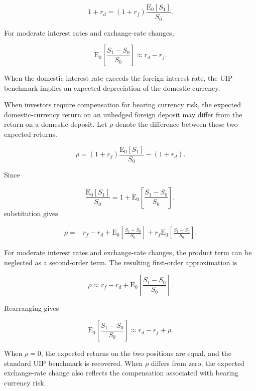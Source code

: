\begin{equation}
1+r_d
=
(1+r_f)\frac{\mathrm{E}_0[S_1]}{S_0}.
\label{eq:ch10-uip-exact}
\end{equation}

For moderate interest rates and exchange-rate changes,

\begin{equation}
\mathrm{E}_0\left[\frac{S_1-S_0}{S_0}\right]
\approx
r_d-r_f.
\label{eq:ch10-uip-approx}
\end{equation}

When the domestic interest rate exceeds the foreign
interest rate, the UIP benchmark implies an expected
depreciation of the domestic currency. 

When investors require compensation for bearing
currency risk, the expected domestic-currency return
on an unhedged foreign deposit may differ from the
return on a domestic deposit. Let $\rho$ denote the
difference between these two expected returns.

\begin{equation}
\rho
=
(1+r_f)\frac{\mathrm{E}_0[S_1]}{S_0}
-
(1+r_d).
\label{eq:ch10-currency-risk-premium}
\end{equation}

Since

\[
\frac{\mathrm{E}_0[S_1]}{S_0}
=
1+
\mathrm{E}_0\left[\frac{S_1-S_0}{S_0}\right],
\]
substitution gives

\begin{align}
\rho
={}&r_f-r_d
+\mathrm{E}_0\left[\frac{S_1-S_0}{S_0}\right]
+r_f\mathrm{E}_0\left[\frac{S_1-S_0}{S_0}\right].
\end{align}

For moderate interest rates and exchange-rate changes,
the product term can be neglected as a second-order
term. The resulting first-order approximation is

\begin{equation}
\rho
\approx
r_f-r_d
+
\mathrm{E}_0\left[\frac{S_1-S_0}{S_0}\right].
\label{eq:ch10-currency-risk-premium-approx}
\end{equation}

Rearranging gives

\begin{equation}
\mathrm{E}_0\left[\frac{S_1-S_0}{S_0}\right]
\approx
r_d-r_f+\rho.
\label{eq:ch10-uip-with-risk-premium}
\end{equation}

When $\rho=0$, the expected returns on the two
positions are equal, and the standard UIP benchmark
is recovered. When $\rho$ differs from zero, the
expected exchange-rate change also reflects the
compensation associated with bearing currency risk.


